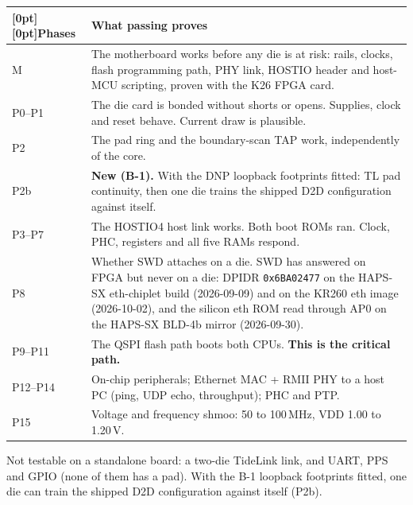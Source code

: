 \documentclass[10pt,a4paper]{article}
\newcommand\hd[1]{\textbf{#1}}
\renewcommand{\arraystretch}{1.18}
\begin{document}
{\small
\renewcommand{\arraystretch}{1.2}
\begin{tabularx}{\textwidth}{@{}P{1.9cm}L@{}}
\toprule
{}[0pt][0pt]\hd{Phases} & \hd{What passing proves} \\
\midrule
M & The motherboard works before any die is at risk: rails, clocks, flash programming path, PHY link, HOSTIO header and host-MCU scripting, proven with the K26 FPGA card. \\
P0--P1 & The die card is bonded without shorts or opens. Supplies, clock and reset behave. Current draw is plausible. \\
P2 & The pad ring and the boundary-scan TAP work, independently of the core. \\
P2b & \textbf{New (B-1).} With the DNP loopback footprints fitted: TL pad continuity, then one die trains the shipped D2D configuration against itself. \\
P3--P7 & The HOSTIO4 host link works. Both boot ROMs ran. Clock, PHC, registers and all five RAMs respond. \\
P8 & Whether SWD attaches on a die. SWD has answered on FPGA but never on a die: DPIDR \texttt{0x6BA02477} on the HAPS-SX eth-chiplet build (2026-09-09) and on the KR260 eth image (2026-10-02), and the silicon eth ROM read through AP0 on the HAPS-SX BLD-4b mirror (2026-09-30). \\
P9--P11 & The QSPI flash path boots both CPUs. \textbf{This is the critical path.} \\
P12--P14 & On-chip peripherals; Ethernet MAC + RMII PHY to a host PC (ping, UDP echo, throughput); PHC and PTP. \\
P15 & Voltage and frequency shmoo: 50 to 100\,MHz, VDD 1.00 to 1.20\,V. \\
\bottomrule
\end{tabularx}}

Not testable on a standalone board: a two-die TideLink link, and UART, PPS and GPIO (none of them has a pad). With the B-1 loopback footprints fitted, one die can train the shipped D2D configuration against itself (P2b).
\end{document}
